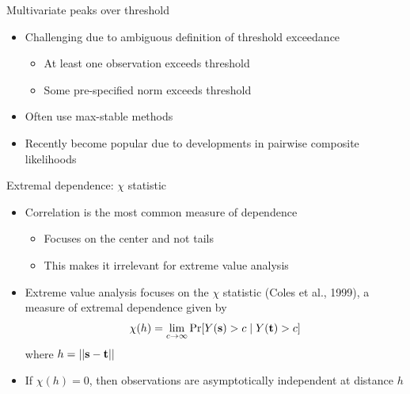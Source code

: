 \documentclass{beamer}
\begin{document}
\begin{frame}{Multivariate peaks over threshold}
  \begin{itemize} \setlength{\itemsep}{1em}
    \item Challenging due to ambiguous definition of threshold exceedance \vspace{0.5em}
    \begin{itemize} \setlength{\itemsep}{0.5em}
      \item At least one observation exceeds threshold
      \item Some pre-specified norm exceeds threshold
    \end{itemize}
    \item Often use max-stable methods
    \item Recently become popular due to developments in pairwise composite likelihoods
  \end{itemize}
\end{frame}

\begin{frame}{Extremal dependence: $\chi$ statistic}
  \begin{itemize} \setlength{\itemsep}{1em}
    \item Correlation is the most common measure of dependence
    \begin{itemize}
      \item Focuses on the center and not tails
      \item This makes it irrelevant for extreme value analysis
    \end{itemize}
    \item Extreme value analysis focuses on the $\chi$ statistic (Coles et al., 1999), a measure of extremal dependence given by
    \begin{align*}
      \chi(h) = \lim_{c \rightarrow \infty}\Pr[Y(\mbox{\bf s}) > c \mid Y(\mbox{\bf t}) > c]
    \end{align*}
    where $h = ||\mbox{\bf s} - \mbox{\bf t}||$
    \item If $ \chi(h) = 0$, then observations are asymptotically independent at distance $h$
  \end{itemize}
\end{frame}
\end{document}

